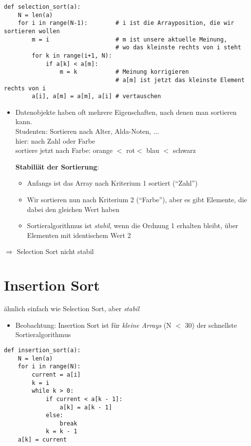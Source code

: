             \begin{verbatim}
def selection_sort(a):
    N = len(a)
    for i in range(N-1):        # i ist die Arrayposition, die wir sortieren wollen
        m = i                   # m ist unsere aktuelle Meinung,
                                # wo das kleinste rechts von i steht
        for k in range(i+1, N):
            if a[k] < a[m]:
                m = k           # Meinung korrigieren
                                # a[m] ist jetzt das kleinste Element rechts von i
        a[i], a[m] = a[m], a[i] # vertauschen
            \end{verbatim}
            \begin{itemize}
                \item Datenobjekte haben oft mehrere Eigenschaften, nach denen man sortieren kann. \\
                Studenten: Sortieren nach Alter, Alda-Noten, ... \\
                hier: nach Zahl oder Farbe\\
                sortiere jetzt nach Farbe: orange $<$ rot$ <$ blau $<$ schwarz

                \textbf{Stabiliät der Sortierung}:
                \begin{itemize}
                    \item Anfangs ist das Array nach Kriterium 1 sortiert (``Zahl'')
                    \item Wir sortieren nun nach Kriterium 2 (``Farbe''), aber es gibt Elemente, die dabei den gleichen Wert haben
                    \item Sortieralgorithmus ist \emph{stabil}, wenn die Ordnung 1 erhalten bleibt, über Elementen mit identischem Wert 2
                \end{itemize}
            \end{itemize}
            $\Rightarrow$ Selection Sort nicht stabil \\

            \section{Insertion Sort}
            ähnlich einfach wie Selection Sort, aber \emph{stabil}
            \begin{itemize}
                \item Beobachtung: Insertion Sort ist für \emph{kleine Arrays} (N $<$ 30) der schnellste Sortieralgorithmus \\
            \end{itemize}
            \begin{verbatim}
def insertion_sort(a):
    N = len(a)
    for i in range(N):
        current = a[i]
        k = i
        while k > 0:
            if current < a[k - 1]:
                a[k] = a[k - 1]
            else:
                break
            k = k - 1
    a[k] = current
            \end{verbatim}

